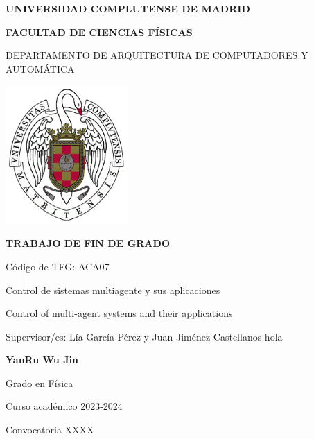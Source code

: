 \documentclass[11pt, a4paper]{article} %
\begin{document}
\begin{titlepage}
\centering
{ \bfseries \Large UNIVERSIDAD COMPLUTENSE DE MADRID}
\vspace{0.5cm}

{\bfseries  \Large FACULTAD DE CIENCIAS FÍSICAS} 
\vspace{1cm}

{\large DEPARTAMENTO DE ARQUITECTURA DE COMPUTADORES Y AUTOMÁTICA}
\vspace{0.8cm}

{\includegraphics[width=0.35\textwidth]{logo.png}} %
\vspace{0.8cm}

{\bfseries \Large TRABAJO DE FIN DE GRADO}
\vspace{2cm}

{\Large Código de TFG:  ACA07 } \vspace{5mm}

{\Large Control de sistemas multiagente y sus aplicaciones}\vspace{5mm}

{\Large Control of multi-agent systems and their applications}\vspace{5mm}

{\Large Supervisor/es: Lía García Pérez y Juan Jiménez Castellanos hola}\vspace{20mm} 

{\bfseries \LARGE YanRu Wu Jin}\vspace{5mm} 

{\large Grado en Física}\vspace{5mm} 

{\large Curso acad\'emico 2023-2024}\vspace{5mm} 

{\large Convocatoria XXXX}\vspace{5mm} 

\end{titlepage}
\newpage
\end{document}
